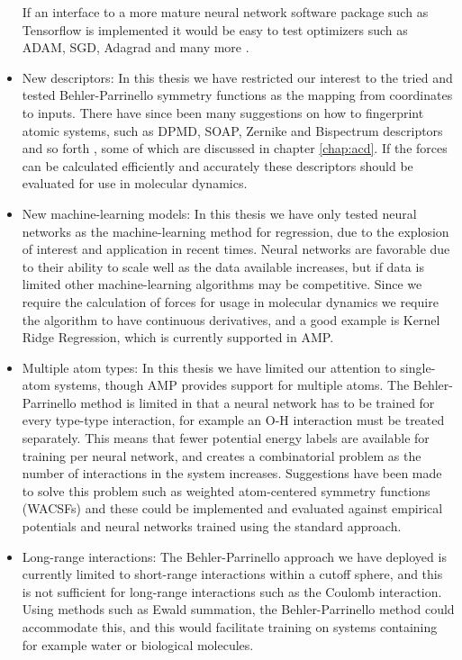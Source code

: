 \begin{itemize}
        If an interface to a more mature neural network software package
        such as Tensorflow is 
        implemented it would be easy to test optimizers such as 
        ADAM, SGD, Adagrad and many more \cite{kingma2014adam}.
    \item New descriptors:
        In this thesis we have restricted our interest to the tried and tested
        Behler-Parrinello symmetry functions as the mapping from
        coordinates to inputs. There have since been many suggestions
        on how to fingerprint atomic systems, such as DPMD, SOAP,
        Zernike and Bispectrum descriptors and so forth
        \cite{PhysRevLett.120.143001, bartok2013representing, khorshidi2016amp},
        some of which are discussed in chapter
        \ref{chap:acd}.
        If the forces can be calculated efficiently and accurately
        these descriptors should be evaluated for use in molecular dynamics.
    \item New machine-learning models:
        In this thesis we have only tested neural networks as the
        machine-learning method for regression, due to the
        explosion of interest and application in recent times.
        Neural networks are favorable due to their ability to scale
        well as the data available increases, but if data is limited
        other machine-learning algorithms may be competitive.
        Since we require the calculation of forces for usage
        in molecular dynamics we require the algorithm to have
        continuous derivatives, and a good example is Kernel Ridge
        Regression, which is currently supported in AMP.
    \item Multiple atom types:
        In this thesis we have limited our attention to single-atom
        systems, though AMP provides support for multiple atoms.
        The Behler-Parrinello method is limited in that a neural network
        has to be trained for every type-type interaction, for example
        an O-H interaction must be treated separately. This means that
        fewer potential energy labels are available for training per neural
        network, and creates a combinatorial problem as the number of interactions
        in the system increases. Suggestions have been made to solve this
        problem such as weighted atom-centered symmetry functions (WACSFs\cite{
            gastegger2018wacsf})
        and these could be implemented and evaluated against
        empirical potentials and neural networks trained using the standard
        approach.
    \item Long-range interactions:
        The Behler-Parrinello approach we have deployed is currently
        limited to short-range interactions within a cutoff sphere,
        and this is not sufficient for long-range interactions such
        as the Coulomb interaction. Using methods such as Ewald summation\cite{
            toukmaji1996ewald},
        the Behler-Parrinello method could accommodate this, and this
        would facilitate training on systems containing for example
        water or biological molecules.
\end{itemize}


